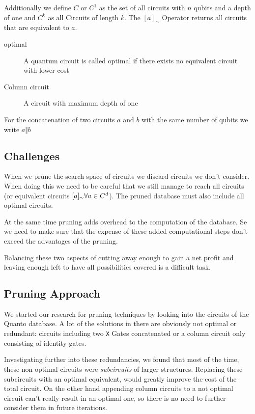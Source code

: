 Additionally we define $C$ or $C^1$ as the set of all circuits with $n$ qubits and a depth of one and $C^k$ as all Circuits of length $k$. The $[a]_\sim$ Operator returns all circuits that are equivalent to $a$.


 
\begin{description}
	\item[optimal] A quantum circuit is called optimal if there exists no equivalent circuit with lower cost
	
	\item[Column circuit] A circuit with maximum depth of one
\end{description}

For the concatenation of two circuits $a$ and $b$ with the same number of qubits we write $a\Vert b$


\subsection{Challenges}
When we prune the search space of circuits we discard circuits we don't consider. When doing this we need to be careful that we still manage to reach all circuits 
(or equivalent circuits $[a]_\sim\space\forall a\in C^d$). The pruned database must also include all optimal circuits.

At the same time pruning adds overhead to the computation of the database. Se we need to make sure that the expense of these added computational steps don't exceed the advantages of the pruning.

Balancing these two aspects of cutting away enough to gain a net profit and leaving enough left to have all possibilities covered is a difficult task.

\subsection{Pruning Approach}
We started our research for pruning techniques by looking into the circuits of the Quanto database. A lot of the solutions in there are obviously not optimal or redundant: circuits including two \texttt{X} Gates concatenated or a column circuit only consisting of identity gates. 

Investigating further into these redundancies, we found that most of the time, these non optimal circuits were \textit{subcircuits} of larger structures. Replacing these subcircuits with an optimal equivalent, would greatly improve the cost of the total circuit. On the other hand appending column circuits to a not optimal circuit can't really result in an optimal one, so there is no need to further consider them in future iterations.\\

